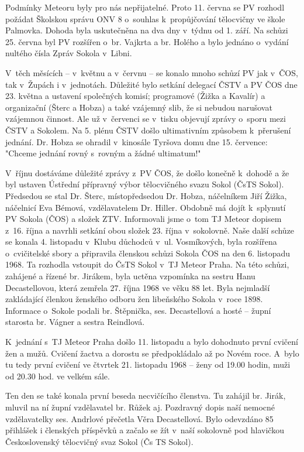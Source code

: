 \documentclass[a5paper, 11pt, twoside]{article}
\begin{document}
Podmínky Meteoru byly pro nás nepřijatelné. Proto 11. června se PV
rozhodl požádat Školskou správu ONV 8 o~souhlas k~propůjčování
tělocvičny ve škole Palmovka. Dohoda byla uskutečněna na dva dny v~týdnu
od 1. září. Na schůzi 25. června byl PV rozšířen o~br. Vajkrta a br.
Holého a bylo jednáno o~vydání nultého čísla Zpráv Sokola v~Libni.

V~těch měsících -- v~květnu a v~červnu -- se konalo mnoho schůzí PV jak
v~ČOS, tak v~Župách i v~jednotách. Důležité bylo setkání delegací ČSTV a
PV ČOS dne 23. května a ustavení společných komisí; programové (Žižka a
Kavalír) a organizační (Šterc a Hobza) a také vzájemný slib, že si
nebudou narušovat vzájemnou činnost. Ale už v~červenci se v~tisku
objevují zprávy o~sporu mezi ČSTV a Sokolem. Na 5. plénu ČSTV došlo
ultimativním způsobem k~přerušení jednání. Dr. Hobza se ohradil
v~kinosále Tyršova domu dne 15. července: "Chceme jednání rovný s~rovným a
žádné ultimatum!"

V~říjnu dostáváme důležité zprávy z~PV ČOS, že došlo konečně k~dohodě a
že byl ustaven Ústřední přípravný výbor tělocvičného svazu Sokol (ČsTS
Sokol). Předsedou se stal Dr. Šterc, místopředsedou Dr. Hobza,
náčelníkem Jiří Žižka, náčelnicí Eva Bémová, vzdělavatelem Dr. Hiller.
Obdobně má dojít k~splynutí PV Sokola (ČOS) a složek ZTV. Informovali
jsme o~tom TJ Meteor dopisem z~16. října a navrhli setkání obou složek
23. října v~sokolovně. Naše další schůze se konala 4. listopadu v~Klubu
důchodců v~ul. Vosmíkových, byla rozšířena o~cvičitelské sbory a
připravila členskou schůzi Sokola ČOS na den 6. listopadu 1968. Ta
rozhodla vstoupit do ČsTS Sokol v~TJ Meteor Praha. Na této schůzi,
zahájené a řízené br. Jirákem, byla uctěna vzpomínka na sestru Hanu
Decastellovou, která zemřela 27. října 1968 ve věku 88 let. Byla
nejmladší zakládající členkou ženského odboru žen libeňského Sokola
v~roce 1898. Informace o~Sokole podali br. Štěpnička, ses. Decastellová a
hosté -- župní starosta br. Vágner a sestra Reindlová.

K~jednání s~TJ Meteor Praha došlo 11. listopadu a bylo dohodnuto první
cvičení žen a mužů. Cvičení žactva a dorostu se předpokládalo až po
Novém roce. A~bylo tu tedy první cvičení ve čtvrtek 21. listopadu 1968
-- ženy od 19.00 hodin, muži od 20.30 hod. ve velkém sále.

Ten den se také konala první beseda necvičícího členstva. Tu zahájil br.
Jirák, mluvil na ní župní vzdělavatel br. Růžek aj. Pozdravný dopis naší
nemocné vzdělavatelky ses. Andrlové přečetla Věra Decastellová. Bylo
odevzdáno 85 přihlášek i členských příspěvků a začalo se žít v~naší
sokolovně pod hlavičkou Československý tělocvičný svaz Sokol (Čs TS
Sokol).
\end{document}
